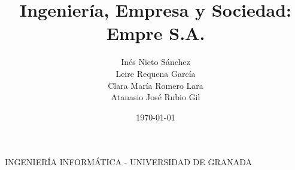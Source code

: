 \documentclass[12pt, spanish]{article}
\title{Ingeniería, Empresa y Sociedad:\\
	Empre S.A. \hspace{0.05cm}}
\author{ Inés Nieto Sánchez \\
	Leire Requena García \\
	Clara María Romero Lara \\
	Atanasio José Rubio Gil}
\date{\today}
\makeatletter
\let\thetitle\@title
\let\theauthor\@author
\let\thedate\@date
\makeatother
\begin{document}
%

\begin{titlepage}
	\begin{center}
		\vspace*{8 cm}
		\textsc{INGENIERÍA INFORMÁTICA - UNIVERSIDAD DE GRANADA} \\
		{\huge \bfseries \thetitle} \\ [8 cm]
	\end{center}    

	\begin{flushright}
		\large \theauthor \\ [1 cm]
	\end{flushright}

	\begin{center}
		\large \thedate
	\end{center}    
\end{titlepage}

%

\tableofcontents
\pagebreak

%

%
%
%

\pagebreak

%



\end{document}
